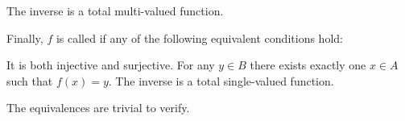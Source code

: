 \begin{definition}
\begin{thmenum}
\begin{minipage}[t]{0.44\textwidth}
\begin{thmenum}[leftmargin=0.9cm]
         The inverse is a total multi-valued function.
      \end{thmenum}
    \end{minipage}

     Finally, \( f \) is called  if any of the following equivalent conditions hold:
    \begin{thmenum}
       It is both injective and surjective.
       For any \( y \in B \) there exists exactly one \( x \in A \) such that \( f(x) = y \).
       The inverse is a total single-valued function.
    \end{thmenum}
  \end{thmenum}
\end{definition}
\begin{defproof}
  The equivalences are trivial to verify.
\end{defproof}

